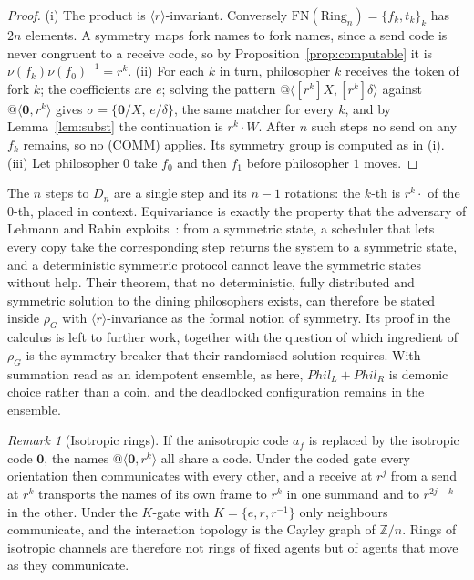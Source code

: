 \documentclass[11pt]{article}
\makeatletter
\theoremstyle{definition}
\theoremstyle{remark}
\newtheorem{remark}[theorem]{Remark}
\newcommand{\calc}{\rho_G}
\newcommand{\nil}{\mathbf{0}}
\newcommand{\qn}[2]{@\langle #1, #2\rangle}
\newcommand{\act}[2]{#1\cdot #2}
\newcommand{\FN}{\mathrm{FN}}
\newcommand{\ring}{\mathrm{Ring}}
\newcommand{\fr}[2]{[#1]#2}
\makeatother
\begin{document}
\begin{proof}
(i) The product is $\langle r\rangle$-invariant. Conversely
$\FN(\ring_n)=\{f_k,t_k\}_{k}$ has $2n$ elements. A symmetry maps fork names
to fork names, since a send code is never congruent to a receive code, so
by Proposition~\ref{prop:computable} it is $\nu(f_k)\nu(f_0)^{-1}=r^k$.
(ii) For each $k$ in turn, philosopher $k$ receives the token of fork $k$; the
coefficients are $e$; solving the pattern
$\qn{\fr{r^k}{X}}{\fr{r^k}{\delta}}$ against $\qn{\nil}{r^k}$ gives
$\sigma=\{\nil/X,\,e/\delta\}$, the same matcher for every $k$, and by
Lemma~\ref{lem:subst} the continuation is $\act{r^k}{W}$. After $n$ such steps no send on any $f_k$ remains, so no
(COMM) applies. Its symmetry group is computed as in (i). (iii) Let
philosopher $0$ take $f_0$ and then $f_1$ before philosopher $1$ moves.
\end{proof}

The $n$ steps to $D_n$ are a single step and its $n-1$ rotations: the $k$-th is
$\act{r^k}{}$ of the $0$-th, placed in context. Equivariance is exactly the
property that the adversary of Lehmann and Rabin exploits~\cite{lehmann-rabin}:
from a symmetric state, a scheduler that lets every copy take the
corresponding step returns the system to a symmetric state, and a deterministic
symmetric protocol cannot leave the symmetric states without help. Their
theorem, that no deterministic, fully distributed and symmetric solution to the
dining philosophers exists, can therefore be stated inside $\calc$ with
$\langle r\rangle$-invariance as the formal notion of symmetry. Its proof in
the calculus is left to further work, together with the question of which
ingredient of $\calc$ is the symmetry breaker that their randomised solution
requires. With summation read as an idempotent ensemble, as here,
$\mathit{Phil}_{L}+\mathit{Phil}_{R}$ is demonic choice rather than a coin, and
the deadlocked configuration remains in the ensemble.

\begin{remark}[Isotropic rings]
If the anisotropic code $a_f$ is replaced by the isotropic code $\nil$, the
names $\qn{\nil}{r^k}$ all share a code. Under the coded gate every orientation
then communicates with every other, and a receive at $r^j$ from a send at
$r^k$ transports the names of its own frame to $r^k$ in one summand and to
$r^{2j-k}$ in the other. Under the $K$-gate with $K=\{e,r,r^{-1}\}$ only neighbours
communicate, and the interaction topology is the Cayley graph of
$\mathbb{Z}/n$. Rings of isotropic channels are therefore not rings of fixed
agents but of agents that move as they communicate.
\end{remark}
\end{document}
